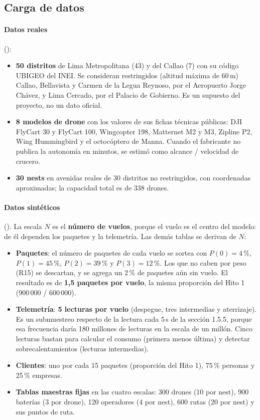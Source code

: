 \subsection{Carga de datos}
\label{sec:carga}

\paragraph{Datos reales} ():
\begin{itemize}
\item \textbf{50 distritos} de Lima Metropolitana (43) y del Callao (7) con su código UBIGEO del INEI. Se consideran restringidos (altitud máxima de 60\,m) Callao, Bellavista y Carmen de la Legua Reynoso, por el Aeropuerto Jorge Chávez, y Lima Cercado, por el Palacio de Gobierno. Es un supuesto del proyecto, no un dato oficial.
\item \textbf{8 modelos de drone} con los valores de sus fichas técnicas públicas: DJI FlyCart 30 y FlyCart 100, Wingcopter 198, Matternet M2 y M3, Zipline P2, Wing Hummingbird y el octocóptero de Manna. Cuando el fabricante no publica la autonomía en minutos, se estimó como alcance / velocidad de crucero.
\item \textbf{30 nests} en avenidas reales de 30 distritos no restringidos, con coordenadas aproximadas; la capacidad total es de 338 drones.
\end{itemize}

\paragraph{Datos sintéticos} (). La escala $N$ es el \textbf{número de vuelos}, porque el vuelo es el centro del modelo: de él dependen los paquetes y la telemetría. Las demás tablas se derivan de $N$:

\begin{itemize}
\item \textbf{Paquetes}: el número de paquetes de cada vuelo se sortea con $P(0)=4\,\%$, $P(1)=45\,\%$, $P(2)=39\,\%$ y $P(3)=12\,\%$. Los que no caben por peso (R15) se descartan, y se agrega un 2\,\% de paquetes aún sin vuelo. El resultado es de \textbf{1,5 paquetes por vuelo}, la misma proporción del Hito 1 (900\,000 / 600\,000).
\item \textbf{Telemetría}: \textbf{5 lecturas por vuelo} (despegue, tres intermedias y aterrizaje). Es un submuestreo respecto de la lectura cada 5\,s de la sección 1.5.5, porque esa frecuencia daría 180 millones de lecturas en la escala de un millón. Cinco lecturas bastan para calcular el consumo (primera menos última) y detectar sobrecalentamientos (lecturas intermedias).
\item \textbf{Clientes}: uno por cada 15 paquetes (proporción del Hito 1), 75\,\% personas y 25\,\% empresas.
\item \textbf{Tablas maestras fijas} en las cuatro escalas: 300 drones (10 por nest), 900 baterías (3 por drone), 120 operadores (4 por nest), 600 rutas (20 por nest) y sus puntos de ruta.
\end{itemize}

